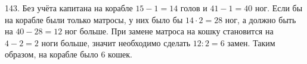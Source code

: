 143. Без учёта капитана на корабле $15-1=14$ голов и $41-1=40$ ног. Если бы на корабле были только матросы, у них было бы $14\cdot2=28$ ног, а должно быть на $40-28=12$ ног больше. При замене матроса на кошку становится на $4-2=2$ ноги больше, значит необходимо сделать $12:2=6$ замен. Таким образом, на корабле было 6 кошек.\\
